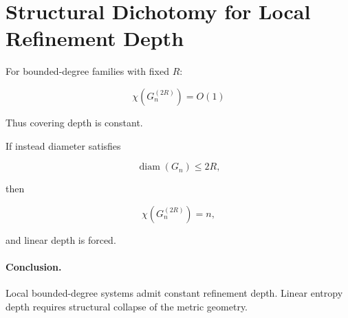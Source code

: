 \section{Structural Dichotomy for Local Refinement Depth}

For bounded-degree families with fixed $R$:

\[
\chi(G_n^{(2R)}) = O(1)
\]

Thus covering depth is constant.

If instead diameter satisfies

\[
\operatorname{diam}(G_n) \le 2R,
\]

then

\[
\chi(G_n^{(2R)}) = n,
\]

and linear depth is forced.

\paragraph{Conclusion.}
Local bounded-degree systems admit constant refinement depth.
Linear entropy depth requires structural collapse of the metric geometry.
